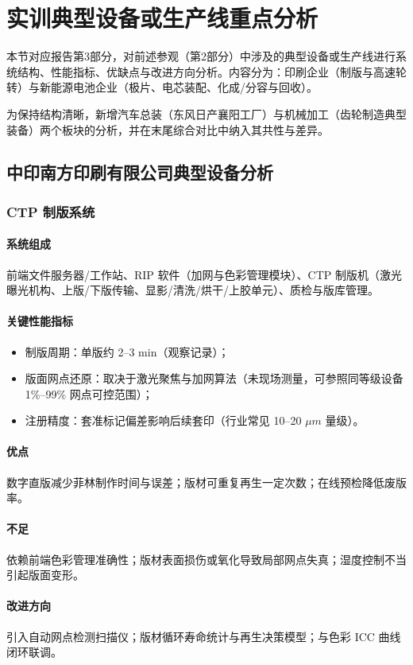 \newpage
\section{实训典型设备或生产线重点分析}

本节对应报告第3部分，对前述参观（第2部分）中涉及的典型设备或生产线进行系统结构、性能指标、优缺点与改进方向分析。内容分为：印刷企业（制版与高速轮转）与新能源电池企业（极片、电芯装配、化成/分容与回收）。

为保持结构清晰，新增汽车总装（东风日产襄阳工厂）与机械加工（齿轮制造典型装备）两个板块的分析，并在末尾综合对比中纳入其共性与差异。

\subsection{中印南方印刷有限公司典型设备分析}

\subsubsection{CTP 制版系统}
\paragraph{系统组成} 前端文件服务器/工作站、RIP 软件（加网与色彩管理模块）、CTP 制版机（激光曝光机构、上版/下版传输、显影/清洗/烘干/上胶单元）、质检与版库管理。
\paragraph{关键性能指标}
\begin{itemize}
	\item 制版周期：单版约 2--3 min（观察记录）；
	\item 版面网点还原：取决于激光聚焦与加网算法（未现场测量，可参照同等级设备 1\%--99\% 网点可控范围）；
	\item 注册精度：套准标记偏差影响后续套印（行业常见 10--20 \(\mu m\) 量级）。
\end{itemize}
\paragraph{优点} 数字直版减少菲林制作时间与误差；版材可重复再生一定次数；在线预检降低废版率。\paragraph{不足} 依赖前端色彩管理准确性；版材表面损伤或氧化导致局部网点失真；湿度控制不当引起版面变形。\paragraph{改进方向} 引入自动网点检测扫描仪；版材循环寿命统计与再生决策模型；与色彩 ICC 曲线闭环联调。

